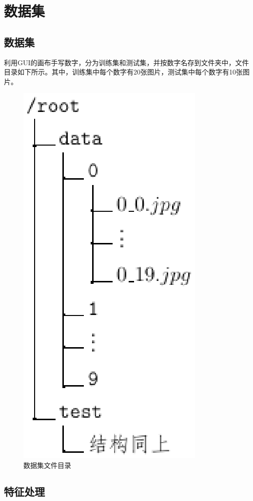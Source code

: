 \documentclass[UTF8, a4paper, 12pt]{report}
\begin{document}
\chapter{数据集}
	\section{数据集}
		利用GUI的画布手写数字，分为训练集和测试集，并按数字名存到文件夹中，文件目录如下所示。其中，训练集中每个数字有20张图片，测试集中每个数字有10张图片。
		\begin{figure}[!h]
			\centering
			\includegraphics[scale=0.8]{./img/DataDirTree.eps}
			\caption{数据集文件目录}
			\label{fig:3.1}
		\end{figure}

	\section{特征处理}
\end{document}
